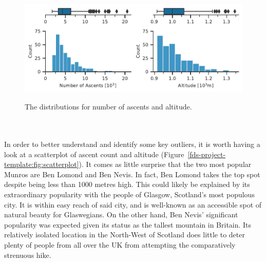\documentclass[11pt,a4paper]{article}
\begin{document}
\begin{figure} [h!]
    \centering
    \includegraphics{report/box_dist.pdf}
    \begin{minipage}[t]{.5\linewidth}
        \centering
        \label{fds-project-template:fig:box_dist_ascents}
    \end{minipage}%
    \begin{minipage}[t]{.5\linewidth}
        \centering
        \label{fds-project-template:fig:box_dist_altitude}
    \end{minipage}
    \caption{The distributions for number of ascents and altitude.}
      \label{fds-project-template:fig:box_dist}
\end{figure}\\ \\
In order to better understand and identify some key outliers, it is worth having a look at a scatterplot of ascent count and altitude (Figure~\ref{fds-project-template:fig:scatterplot}). It comes as little surprise that the two most popular Munros are Ben Lomond and Ben Nevis. In fact, Ben Lomond takes the top spot despite being less than 1000 metres high. This could likely be explained by its extraordinary popularity with the people of Glasgow, Scotland's most populous city. It is within easy reach of said city, and is well-known as an accessible spot of natural beauty for Glaswegians. On the other hand, Ben Nevis' significant popularity was expected given its status as the tallest mountain in Britain. Its relatively isolated location in the North-West of Scotland does little to deter plenty of people from all over the UK from attempting the comparatively strenuous hike.
\end{document}
